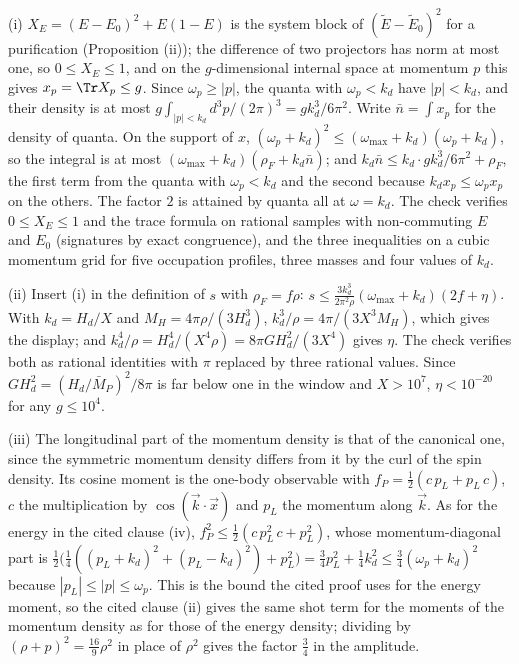 (i) $X_{E} = (E - E_{0})^{2} + E(1 - E)$ is the system block of $(\widetilde E - \widetilde E_{0})^{2}$ for a purification (Proposition (ii)); the difference of two projectors has norm at most one, so $0 \le X_{E} \le 1$, and on the $g$-dimensional internal space at momentum $p$ this gives $x_{p} = \Tr X_{p} \le g$. Since $\omega_{p} \ge |p|$, the quanta with $\omega_{p} < k_{d}$ have $|p| < k_{d}$, and their density is at most $g\int_{|p| < k_{d}}d^{3}p/(2\pi)^{3} = gk_{d}^{3}/6\pi^{2}$. Write $\bar n = \int x_{p}$ for the density of quanta. On the support of $x$, $(\omega_{p} + k_{d})^{2} \le (\omega_{\max} + k_{d})(\omega_{p} + k_{d})$, so the integral is at most $(\omega_{\max} + k_{d})(\rho_{F} + k_{d}\bar n)$; and $k_{d}\bar n \le k_{d}\cdot gk_{d}^{3}/6\pi^{2} + \rho_{F}$, the first term from the quanta with $\omega_{p} < k_{d}$ and the second because $k_{d} x_{p} \le \omega_{p}x_{p}$ on the others. The factor $2$ is attained by quanta all at $\omega = k_{d}$. The check verifies $0 \le X_{E} \le 1$ and the trace formula on rational samples with non-commuting $E$ and $E_{0}$ (signatures by exact congruence), and the three inequalities on a cubic momentum grid for five occupation profiles, three masses and four values of $k_{d}$.

(ii) Insert (i) in the definition of $s$ with $\rho_{F} = f\rho$: $s \le \tfrac{3k_{d}^{3}}{2\pi^{2}\rho}(\omega_{\max} + k_{d})(2f + \eta)$. With $k_{d} = H_{d}/X$ and $M_{H} = 4\pi\rho/(3H_{d}^{3})$, $k_{d}^{3}/\rho = 4\pi/(3X^{3}M_{H})$, which gives the display; and $k_{d}^{4}/\rho = H_{d}^{4}/(X^{4}\rho) = 8\pi GH_{d}^{2}/(3X^{4})$ gives $\eta$. The check verifies both as rational identities with $\pi$ replaced by three rational values. Since $GH_{d}^{2} = (H_{d}/\bar M_{P})^{2}/8\pi$ is far below one in the window and $X > 10^{7}$, $\eta < 10^{-20}$ for any $g \le 10^{4}$.

(iii) The longitudinal part of the momentum density is that of the canonical one, since the symmetric momentum density differs from it by the curl of the spin density. Its cosine moment is the one-body observable with $f_{P} = \tfrac12(c\,p_{L} + p_{L}\,c)$, $c$ the multiplication by $\cos(\vec k\cdot\vec x)$ and $p_{L}$ the momentum along $\vec k$. As for the energy in the cited clause (iv), $f_{P}^{2} \le \tfrac12(c\,p_{L}^{2}\,c + p_{L}^{2})$, whose momentum-diagonal part is $\tfrac12\bigl(\tfrac14((p_{L} + k_{d})^{2} + (p_{L} - k_{d})^{2}) + p_{L}^{2}\bigr) = \tfrac34p_{L}^{2} + \tfrac14k_{d}^{2} \le \tfrac34(\omega_{p} + k_{d})^{2}$ because $|p_{L}| \le |p| \le \omega_{p}$. This is the bound the cited proof uses for the energy moment, so the cited clause (ii) gives the same shot term for the moments of the momentum density as for those of the energy density; dividing by $(\rho + p)^{2} = \tfrac{16}{9}\rho^{2}$ in place of $\rho^{2}$ gives the factor $\tfrac34$ in the amplitude.

